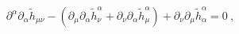 \begin{equation}
\partial ^{\alpha }\partial _{\alpha }\tilde{h}_{\mu \nu }-\left( \partial
_{\mu }\partial _{\alpha }\tilde{h}_{\nu }^{\alpha }+\partial _{\nu
}\partial _{\alpha }\tilde{h}_{\mu }^{\alpha }\right) +\partial _{\nu
}\partial _{\mu }\tilde{h}_{\alpha }^{\alpha }=0\ ,
\end{equation}%
